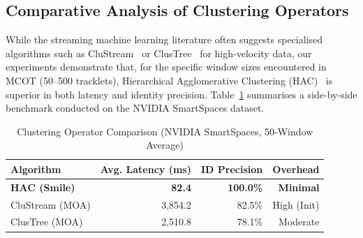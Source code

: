 \documentclass[review]{elsarticle}
\begin{document}

\subsection{Comparative Analysis of Clustering Operators}
While the streaming machine learning literature often suggests specialised algorithms such as CluStream~\cite{aggarwal2003framework} or ClusTree~\cite{kranen2011clustree} for high-velocity data, our experiments demonstrate that, for the specific window sizes encountered in MCOT (50--500 tracklets), Hierarchical Agglomerative Clustering (HAC)~\cite{mullner2011modern} is superior in both latency and identity precision. Table~\ref{tab:clustering_comparison} summarises a side-by-side benchmark conducted on the NVIDIA SmartSpaces dataset.

\begin{table}[H]
    \centering
    \caption{Clustering Operator Comparison (NVIDIA SmartSpaces, 50-Window Average)}
    \label{tab:clustering_comparison}
    \begin{tabular}{@{}lrrr@{}}
        \toprule
        \textbf{Algorithm} & \textbf{Avg. Latency (ms)} & \textbf{ID Precision} & \textbf{Overhead} \\ \midrule
        \textbf{HAC (Smile)} & \textbf{82.4} & \textbf{100.0\%} & \textbf{Minimal} \\
        CluStream (MOA) & 3,854.2 & 82.5\% & High (Init) \\
        ClusTree (MOA) & 2,510.8 & 78.1\% & Moderate \\ \bottomrule
    \end{tabular}
\end{table}
\end{document}

